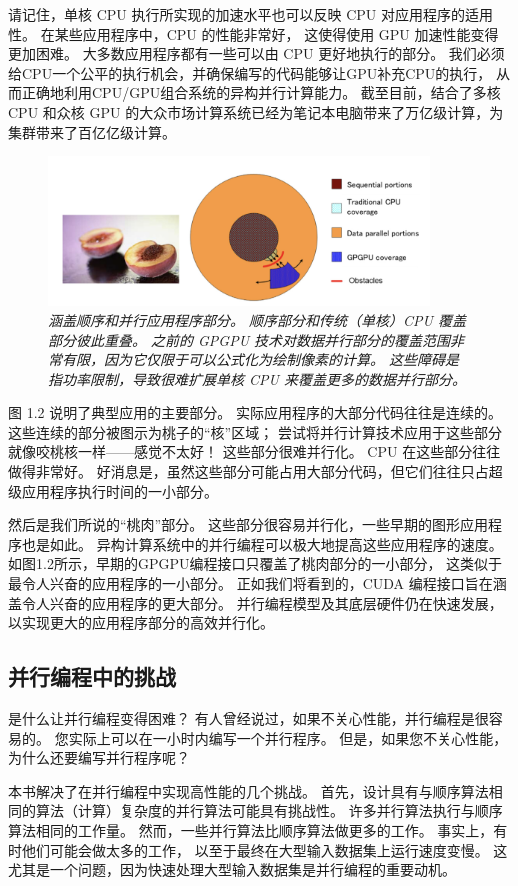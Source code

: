 请记住，单核 CPU 执行所实现的加速水平也可以反映 CPU 对应用程序的适用性。 在某些应用程序中，CPU 的性能非常好，
这使得使用 GPU 加速性能变得更加困难。 大多数应用程序都有一些可以由 CPU 更好地执行的部分。 
我们必须给CPU一个公平的执行机会，并确保编写的代码能够让GPU补充CPU的执行，
从而正确地利用CPU/GPU组合系统的异构并行计算能力。 
截至目前，结合了多核 CPU 和众核 GPU 的大众市场计算系统已经为笔记本电脑带来了万亿级计算，为集群带来了百亿亿级计算。
\begin{figure}[H]
	\centering
	\includegraphics[width=0.9\textwidth]{figs/F1.2.png}
	\caption{\textit{涵盖顺序和并行应用程序部分。 顺序部分和传统（单核）CPU 覆盖部分彼此重叠。 
	之前的 GPGPU 技术对数据并行部分的覆盖范围非常有限，因为它仅限于可以公式化为绘制像素的计算。 
	这些障碍是指功率限制，导致很难扩展单核 CPU 来覆盖更多的数据并行部分。}}
\end{figure}

图 1.2 说明了典型应用的主要部分。 实际应用程序的大部分代码往往是连续的。 这些连续的部分被图示为桃子的“核”区域； 
尝试将并行计算技术应用于这些部分就像咬桃核一样——感觉不太好！ 这些部分很难并行化。 CPU 在这些部分往往做得非常好。 
好消息是，虽然这些部分可能占用大部分代码，但它们往往只占超级应用程序执行时间的一小部分。

然后是我们所说的“桃肉”部分。 这些部分很容易并行化，一些早期的图形应用程序也是如此。 
异构计算系统中的并行编程可以极大地提高这些应用程序的速度。 如图1.2所示，早期的GPGPU编程接口只覆盖了桃肉部分的一小部分，
这类似于最令人兴奋的应用程序的一小部分。 正如我们将看到的，CUDA 编程接口旨在涵盖令人兴奋的应用程序的更大部分。 
并行编程模型及其底层硬件仍在快速发展，以实现更大的应用程序部分的高效并行化。

\subsection{并行编程中的挑战}
是什么让并行编程变得困难？ 有人曾经说过，如果不关心性能，并行编程是很容易的。 您实际上可以在一小时内编写一个并行程序。 
但是，如果您不关心性能，为什么还要编写并行程序呢？

本书解决了在并行编程中实现高性能的几个挑战。 首先，设计具有与顺序算法相同的算法（计算）复杂度的并行算法可能具有挑战性。 
许多并行算法执行与顺序算法相同的工作量。 然而，一些并行算法比顺序算法做更多的工作。 事实上，有时他们可能会做太多的工作，
以至于最终在大型输入数据集上运行速度变慢。 这尤其是一个问题，因为快速处理大型输入数据集是并行编程的重要动机。


